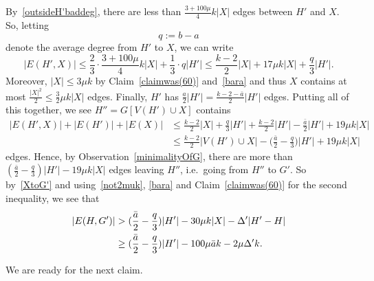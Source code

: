\documentclass[12pt]{article}
\begin{document}
      By~\eqref{outsideH'baddeg}, 
         there are less than $\frac{3+100\mu}4 k|X|$ edges between $H'$ and $X$. So, letting $$q:=b-a$$
         denote the average degree from $H'$ to $X$, we can write $$|E(H',X)| \le   \frac 23 \cdot\frac{3+100\mu}4 k|X| +  \frac 13\cdot q |H'| \le \frac{k-2}2|X| + 17\mu k |X| + \frac q3 |H'|.$$
              Moreover,   $|X|\le 3\mu k$ 
              by Claim~\ref{claimwas(60)} 
         and~\eqref{bara} and thus $X$ contains at most $\frac{|X|^2}2\le \frac 32 \mu k|X|$ edges. Finally, $H'$ has  $\frac{a}2|H'|=\frac{k-2-\bar a}2|H'|$ edges. Putting all of this together, we see
         $H''=G[V(H') \cup X]$   contains
         \begin{align*}
         |E(H',X)|  +    |E(H')|+|E(X)| 
        &  \le
          \frac{k-2}2|X|  + \frac q3 |H'| + \frac{k-2}2|H'|-\frac{\bar a}2|H'| + 19\mu k |X|
         \\ &
            \le
       \frac{k-2}2 | V(H')\cup X| -  \big(\frac{\bar a}2- \frac q3 \big) |H'| +19 \mu k|X|
         \end{align*}
          edges. Hence, by Observation~\ref{minimalityOfG}, there are more than  $(\frac{\bar a}2 -\frac q3) |H'| -19 \mu k|X|$ edges 
 leaving   $H''$, i.e.~going from $H''$ to $G'$. 
  So by~\eqref{XtoG'} and  using~\eqref{not2muk}, \eqref{bara} and Claim~\ref{claimwas(60)}
  for the second inequality,  we see that 
   \begin{align}\label{EHG'2}
  |E(H, G')| &> (\frac{\bar a}2 -\frac q3) |H'| -30 \mu k|X|-\Delta' |H'-H| \notag \\ & \ge (\frac{\bar a}2 -\frac q3) |H'| -100 \mu \bar a  k   -2\mu \Delta' k. \end{align}  
  
 We are ready for the next claim.
        
\end{document}
